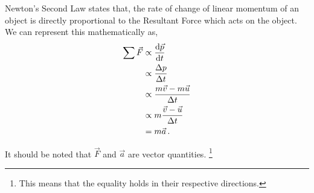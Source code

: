 %
%
%


\begin{subquestions}
	
\subquestion

\begin{subsubquestions}
	
\subsubquestion

Newton's Second Law states that, the rate of change of linear momentum of an object is directly proportional to the Resultant Force which acts on the object. We can represent this mathematically as,
\begin{align} 
	\sum \vec{F} & \propto \frac{\mathrm{d}\vec{p}}{\mathrm{d}t} \nonumber \\
	             & \propto \frac{\Delta p}{\Delta t} \nonumber \\
	             & \propto \frac{m\vec{v}-m\vec{u}}{\Delta t} \nonumber \\
	             & \propto m\frac{\vec{v}-\vec{u}}{\Delta t} \nonumber \\
	             & = m\vec{a} \,.
\end{align}

It should be noted that $\vec{F}$ and $\vec{a}$ are vector quantities. \footnote{This means that the equality holds in their respective directions.}
\end{subsubquestions}
	

\subsubquestion
	

\end{subquestions}
